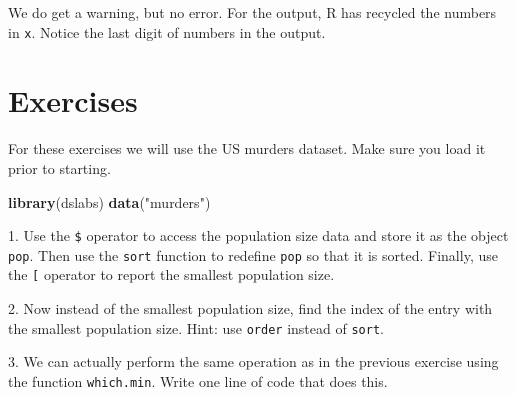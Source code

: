 \documentclass[
]{krantz}
\newenvironment{Shaded}{\begin{snugshade}}{\end{snugshade}}
\newcommand{\CommentTok}[1]{\textcolor[rgb]{0.37,0.37,0.37}{\textit{#1}}}
\newcommand{\DecValTok}[1]{\textcolor[rgb]{0.06,0.06,0.06}{#1}}
\newcommand{\KeywordTok}[1]{\textcolor[rgb]{0.27,0.27,0.27}{\textbf{#1}}}
\newcommand{\NormalTok}[1]{#1}
\newcommand{\OperatorTok}[1]{\textcolor[rgb]{0.43,0.43,0.43}{\textbf{#1}}}
\newcommand{\StringTok}[1]{\textcolor[rgb]{0.5,0.5,0.5}{#1}}
\begin{document}
We do get a warning, but no error. For the output, R has recycled the numbers in \texttt{x}. Notice the last digit of numbers in the output.

\hypertarget{exercises-3}{%
\section{Exercises}\label{exercises-3}}

For these exercises we will use the US murders dataset. Make sure you load it prior to starting.

\begin{Shaded}
\begin{Highlighting}[]
\KeywordTok{library}\NormalTok{(dslabs)}
\KeywordTok{data}\NormalTok{(}\StringTok{"murders"}\NormalTok{)}
\end{Highlighting}
\end{Shaded}

1. Use the \texttt{\$} operator to access the population size data and store it as the object \texttt{pop}. Then use the \texttt{sort} function to redefine \texttt{pop} so that it is sorted. Finally, use the \texttt{{[}} operator to report the smallest population size.

\begin{Shaded}
\end{Shaded}

2. Now instead of the smallest population size, find the index of the entry with the smallest population size. Hint: use \texttt{order} instead of \texttt{sort}.

\begin{Shaded}
\end{Shaded}

3. We can actually perform the same operation as in the previous exercise using the function \texttt{which.min}. Write one line of code that does this.

\begin{Shaded}
\end{Shaded}
\end{document}
